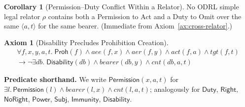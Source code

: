 \documentclass{IOS-Book-Article}
\newcommand{\PermPos}{\mathsf{Permission}}   %
\newcommand{\Duty}{\mathsf{Duty}}            %
\newcommand{\Right}{\mathsf{Right}}          %
\newcommand{\NoRight}{\mathsf{NoRight}}      %
\newcommand{\Power}{\mathsf{Power}}          %
\newcommand{\Disability}{\mathsf{Disability}} %
\newcommand{\Immunity}{\mathsf{Immunity}}
\newcommand{\Subj}{\mathsf{Subj}}       %
\newcommand{\Proh}{\mathsf{Proh}}
\theoremstyle{definition}
\newtheorem{axiom}{Axiom}[section]
\newtheorem{corollary}{Corollary}[section]
\begin{document}
\begin{corollary}[Permission--Duty Conflict Within a Relator]
\label{ax:conflict}
No ODRL simple legal relator $\rho$ contains both a Permission to Act and
a Duty to Omit over the same $\langle a,t\rangle$ for the same bearer.
(Immediate from Axiom~\ref{ax:cross-relator}.)
\end{corollary}
\begin{axiom}[Disability Precludes Prohibition Creation]
\label{ax:disability-block}
\begin{multline*}
  \forall f,x,y,a,t.\;
  \Proh(f)\land\mathit{aee}(f,x)\land\mathit{aer}(f,y)
  \land\mathit{act}(f,a)\land\mathit{tgt}(f,t) \\
  \to\neg\exists\mathit{db}.\;
  \Disability(\mathit{db})\land\mathit{bearer}(\mathit{db},y)
  \land\mathit{cnt}(\mathit{db},a,t)
\end{multline*}
\end{axiom}



\noindent\textbf{Predicate shorthand.}
We write $\PermPos(x,a,t)$ for
$\exists l.\,\PermPos(l)\land\mathit{bearer}(l,x)\land\mathit{cnt}(l,a,t)$;
analogously for $\Duty$, $\Right$, $\NoRight$, $\Power$, $\Subj$,
$\Immunity$, $\Disability$.
\end{document}
